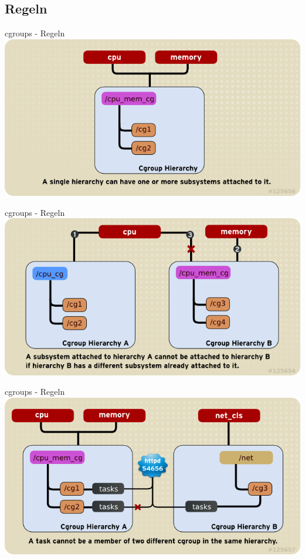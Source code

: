 \documentclass[14pt]{beamer}
\begin{document}
    \subsection{Regeln}
    \begin{frame}{cgroups - Regeln}
    \centering\includegraphics[scale=0.7]{logo/RMG-rule1}
    \end{frame}
    \begin{frame}{cgroups - Regeln}
    \centering\includegraphics[scale=0.7]{logo/RMG-rule2}
    \end{frame}
    \begin{frame}{cgroups - Regeln}
    \centering\includegraphics[scale=0.7]{logo/RMG-rule3}
    \end{frame}
\end{document}
